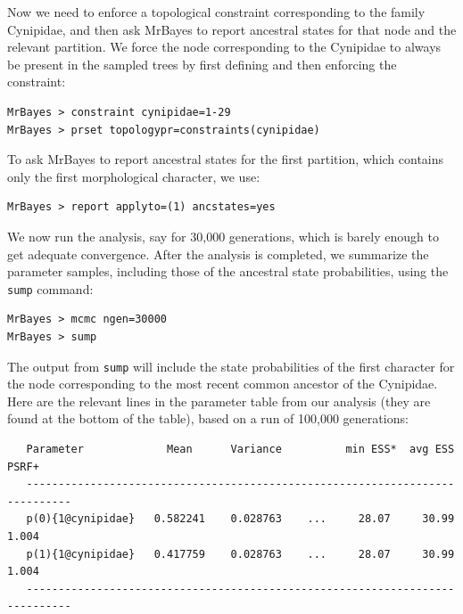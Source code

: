 \documentclass[12pt]{book}
\newcommand{\ttt}[1]{\texttt{#1}}
\begin{document}
Now we need to enforce a topological constraint corresponding to the family Cynipidae, and then ask
MrBayes to report ancestral states for that node and the relevant partition. We force the node
corresponding to the Cynipidae to always be present in the sampled trees by first defining and then
enforcing the constraint:

\begin{singlespacing}
\begin{verbatim}
MrBayes > constraint cynipidae=1-29
MrBayes > prset topologypr=constraints(cynipidae)
\end{verbatim}
\end{singlespacing}

To ask MrBayes to report ancestral states for the first partition, which contains only the first
morphological character, we use:

\begin{verbatim}
MrBayes > report applyto=(1) ancstates=yes
\end{verbatim}

We now run the analysis, say for 30,000 generations, which is barely enough to get adequate
convergence. After the analysis is completed, we summarize the parameter samples, including those
of the ancestral state probabilities, using the \ttt{sump} command:

\begin{singlespacing}
\begin{verbatim}
MrBayes > mcmc ngen=30000
MrBayes > sump
\end{verbatim}
\end{singlespacing}

The output from \ttt{sump} will include the state probabilities of the first character for the node
corresponding to the most recent common ancestor of the Cynipidae. Here are the relevant lines in
the parameter table from our analysis (they are found at the bottom of the table), based on a run
of 100,000 generations:

\begin{singlespacing}
\footnotesize
\begin{verbatim}
   Parameter             Mean      Variance          min ESS*  avg ESS    PSRF+ 
   -----------------------------------------------------------------------------
   p(0){1@cynipidae}   0.582241    0.028763    ...     28.07     30.99    1.004
   p(1){1@cynipidae}   0.417759    0.028763    ...     28.07     30.99    1.004
   -----------------------------------------------------------------------------
\end{verbatim}
\end{singlespacing}
\normalsize
\end{document}
